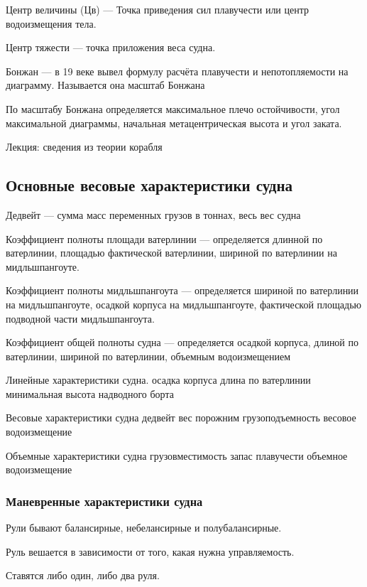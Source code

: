 \documentclass{article}        %
\begin{document}
Центр величины (Цв) --- Точка приведения сил плавучести или центр водоизмещения тела.

Центр тяжести --- точка приложения веса судна.

Бонжан --- в 19 веке вывел формулу расчёта плавучести и непотопляемости на диаграмму.
	Называется она масштаб Бонжана

По масштабу Бонжана определяется максимальное плечо остойчивости, угол максимальной диаграммы, начальная метацентрическая высота и угол заката.

Лекция: сведения из теории корабля

\subsection{Основные весовые характеристики судна}
Дедвейт --- сумма масс переменных грузов в тоннах, весь вес судна

Коэффициент полноты площади ватерлинии --- определяется длинной по ватерлинии, площадью фактической ватерлинии, шириной по ватерлинии на мидльшпангоуте.

Коэффициент полноты мидльшпангоута --- определяется шириной по ватерлинии на мидльшпангоуте,
осадкой корпуса на мидльшпангоуте, фактической площадью подводной части мидльшпангоута. 

Коэффициент общей полноты судна --- определяется осадкой корпуса, длиной по ватерлинии, 
	шириной по ватерлинии, объемным водоизмещением

Линейные характеристики судна.
	осадка корпуса
	длина по ватерлинии
	минимальная высота надводного борта

Весовые характеристики судна
	дедвейт
	вес порожним
	грузоподъемность
	весовое водоизмещение

Объемные характеристики судна
	грузовместимость
	запас плавучести
	объемное водоизмещение

\subsubsection{Маневренные характеристики судна}
Рули бывают балансирные, небелансирные и полубалансирные.

Руль вешается в зависимости от того, какая нужна управляемость.

Ставятся либо один, либо два руля.
\end{document}
